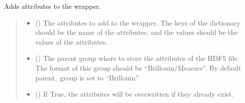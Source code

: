 \documentclass[letterpaper,10pt,english]{sphinxmanual}
\begin{document}
\begin{fulllineitems}
\begin{fulllineitems}
\end{fulllineitems}


\begin{fulllineitems}
\label{\detokenize{source/HDF5_BLS:HDF5_BLS.wrapper.Wrapper.add_attributes}}
\pysigstartsignatures
\pysiglinewithargsret
{}
{\sphinxparamcomma {}\sphinxparamcomma {}}
{}
\pysigstopsignatures
\sphinxAtStartPar
Adds attributes to the wrapper.
\begin{quote}\begin{description}
\begin{itemize}
\item {} 
\sphinxAtStartPar
{} () \textendash{} The attributes to add to the wrapper. The keys of the dictionary should be the name of the attributes, and the values should be the values of the attributes.

\item {} 
\sphinxAtStartPar
{} (\sphinxstyleliteralemphasis{\sphinxupquote{, }}) \textendash{} The parent group where to store the attributes of the HDF5 file. The format of this group should be “Brillouin/Measure”. By default parent\_group is set to “Brillouin”.

\item {} 
\sphinxAtStartPar
{} (\sphinxstyleliteralemphasis{\sphinxupquote{, }}) \textendash{} If True, the attributes will be overwritten if they already exist.

\end{itemize}

\end{description}\end{quote}

\end{fulllineitems}


\end{fulllineitems}
\end{document}
